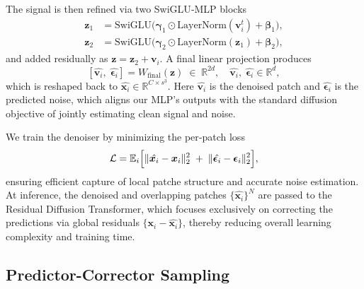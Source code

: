 The signal is then refined via two SwiGLU‐MLP blocks
\[
\begin{aligned}
  \boldsymbol{z}_1 &= \mathrm{SwiGLU}\bigl(\boldsymbol{\gamma}_1\odot\mathrm{LayerNorm}(\boldsymbol{v}_i^t)+\boldsymbol{\beta}_1\bigr),\\
  \boldsymbol{z}_2 &= \mathrm{SwiGLU}\bigl(\boldsymbol{\gamma}_2\odot\mathrm{LayerNorm}(\boldsymbol{z}_1)+\boldsymbol{\beta}_2\bigr),
\end{aligned}
\]
and added residually as \(\boldsymbol{z}=\boldsymbol{z}_2+\boldsymbol{v}_i\). A final linear projection produces 
\[
[\hat{\boldsymbol{v}_i},\;\hat{\boldsymbol{\epsilon}_i}]
= W_{\mathrm{final}}(\boldsymbol{z})
\;\in\;\mathbb{R}^{2d},
\quad
\hat{\boldsymbol{v}_i},\;\hat{\boldsymbol{\epsilon}_i}\in\mathbb{R}^d,
\]
which is reshaped back to \(\hat{\boldsymbol{x}_i}\in\mathbb{R}^{C\times s^3}\). Here \(\hat{\boldsymbol{v}_i}\) is the denoised patch and \(\hat{\boldsymbol{\epsilon}_i}\) is the predicted noise, which aligns our MLP's outputs with the standard diffusion objective of jointly estimating clean signal and noise.

We train the denoiser by minimizing the per‐patch loss
\[
  \mathcal{L}
  = \mathbb{E}_{i}\Bigl[\|\hat{\boldsymbol{x}_i} - \boldsymbol{x}_i\|_2^2
    \;+\;\|\hat{\boldsymbol{\epsilon}_i} - \boldsymbol{\epsilon}_i\|_2^2\Bigr],
\]
ensuring efficient capture of local patche structure and accurate noise estimation. At inference, the denoised and overlapping patches \(\{\hat{\boldsymbol{x}_i}\}^N\) are passed to the Residual Diffusion Transformer, which focuses exclusively on correcting the predictions via global residuals $\{\boldsymbol{x}_i - \hat{\boldsymbol{x}_i}\}$, thereby reducing overall learning complexity and training time.

\subsection{Predictor-Corrector Sampling}\label{ap:predictor-corrector-details}


